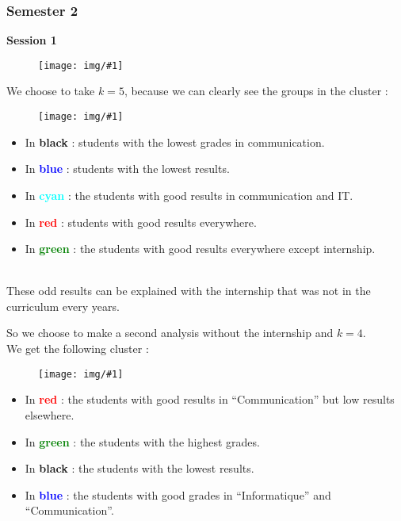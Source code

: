 \documentclass[11pt, a4paper]{article}
\newcommand\image[2]{
	\begin{figure}[H]
	\centering
	\texttt{[image: img/\#1]}
	\end{figure}
}
\begin{document}
    \subsubsection{Semester 2}

    \textbf{\large{Session 1}}

    \image{image26.png}{380px}

    We choose to take $k=5$, because we can clearly see the groups in the cluster :

    \image{image27.png}{480px}

    \begin{multicols}{2}
        \begin{itemize}
            \item In \textbf{black} : students with the lowest grades in communication.
            \item In \textbf{\textcolor{blue}{blue}} : students with the lowest results.  
            \item In \textbf{\textcolor{cyan}{cyan}} : the students with good results in communication and IT. 
            \item In \textbf{\textcolor{red}{red}} : students with good results everywhere.
            \item In \textbf{\textcolor{green}{green}} : the students with good results everywhere except internship.\\\\
        \end{itemize}
    \end{multicols}

    \newpage
    These odd results can be explained with the internship that was not in the curriculum every years.

    So we choose to make a second analysis without the internship and $k=4$.\\
    We get the following cluster :

    \image{image28.png}{500px}

    \begin{multicols}{2}
        \begin{itemize}
            \item In \textbf{\textcolor{red}{red}} : the students with good results in “Communication” but low results elsewhere.
            \item In \textbf{\textcolor{green}{green}} : the students with the highest grades.
            \item In \textbf{black} : the students with the lowest results.
            \item In \textbf{\textcolor{blue}{blue}} : the students with good grades in “Informatique” and “Communication”.
        \end{itemize}
    \end{multicols}
\end{document}
